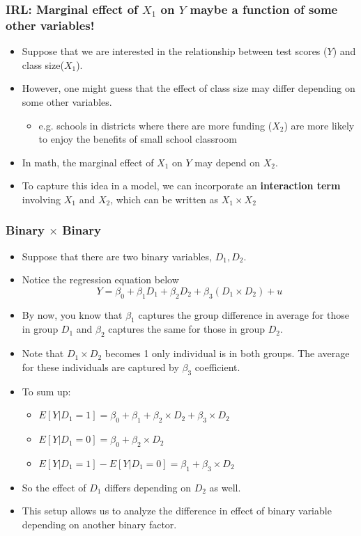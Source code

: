 \documentclass[aspectratio=169]{beamer}
\begin{document}
\begin{frame}
\frametitle{IRL: Marginal effect of $X_1$ on $Y$ maybe a function of some other variables!}
\begin{itemize}
\item Suppose that we are interested in the relationship between test scores ($Y$) and class size($X_1$). 
\item However, one might guess that the effect of class size may differ depending on some other variables. 
\begin{itemize}
\item e.g. schools in districts where there are more funding ($X_2$) are more likely to enjoy the benefits of small school classroom
\end{itemize}
\item In math, the marginal effect of $X_1$ on $Y$ may depend on $X_2$. 
\item To capture this idea in a model, we can incorporate an \textbf{interaction term} involving $X_1$ and $X_2$, which can be written as $X_1 \times X_2$ \par\medskip
\end{itemize}
\end{frame}

\begin{frame}
\frametitle{Binary $\times$ Binary}
\begin{itemize}
\item Suppose that there are two binary variables, $D_1, D_2$.
\item Notice the regression equation below
\[
Y= \beta_0 + \beta_1 D_1 + \beta_2 D_2 + \beta_3 (D_1 \times D_2) + u
\]  
\item By now, you know that $\beta_1$ captures the group difference in average for those in group $D_1$ and $\beta_2$ captures the same for those in group $D_2$. 
\item Note that $D_1 \times D_2$ becomes 1 only individual is in both groups. The average for these individuals are captured by $\beta_3$ coefficient. 
\item To sum up:
\begin{itemize}
\item $E[Y|D_1 = 1] = \beta_0+\beta_1+\beta_2\times D_2+\beta_3\times D_2$
\item $E[Y|D_1 = 0] = \beta_0+\beta_2\times D_2$
\item $E[Y|D_1 = 1]-E[Y|D_1 = 0] = \beta_1 + \beta_3\times D_2$
\end{itemize}
\item So the effect of $D_1$ differs depending on $D_2$ as well. 
\item This setup allows us to analyze the difference in effect of binary variable depending on another binary factor. 
\end{itemize}
\end{frame}
\end{document}
